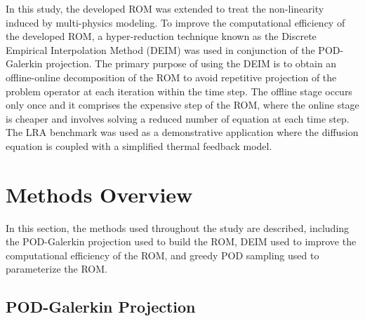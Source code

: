 \documentclass[]{interact}
\theoremstyle{plain}%
\theoremstyle{definition}
\theoremstyle{remark}
\begin{document}
In this study, the developed ROM was extended to treat the non-linearity induced by multi-physics modeling.
To improve the computational efficiency of the developed ROM, a hyper-reduction technique known as the Discrete Empirical Interpolation Method (DEIM) was used in conjunction of the POD-Galerkin projection.
The primary purpose of using the DEIM is to obtain an offline-online decomposition of the ROM to avoid repetitive projection of the problem operator at each iteration within the time step.
The offline stage occurs only once and it comprises the expensive step of the ROM, where the online stage is cheaper and involves solving a reduced number of equation at each time step.
The LRA benchmark was used as a demonstrative application where the diffusion equation is coupled with a simplified thermal feedback model.


\section{Methods Overview}

In this section, the methods used throughout the study are described, including the POD-Galerkin projection used to build the ROM, DEIM used to improve the computational efficiency of the ROM, and greedy POD sampling used to parameterize the ROM.


\subsection{POD-Galerkin Projection}\label{class}
\end{document}
